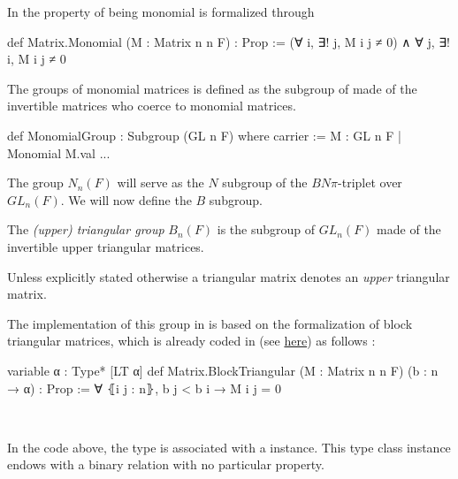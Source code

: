 \begin{implementation}
    In \Lean the property of being monomial is formalized through
    \begin{leancode}
def Matrix.Monomial (M : Matrix n n F) : Prop := 
    (∀ i, ∃! j, M i j ≠ 0) ∧ ∀ j, ∃! i, M i j ≠ 0
    \end{leancode}
    The groups of monomial matrices is defined as the subgroup of  made of the invertible matrices who coerce to monomial matrices.
    \begin{leancode}
def MonomialGroup : Subgroup (GL n F) where
  carrier := {M : GL n F | Monomial M.val}
    ...
\end{leancode}

\begin{comment}
    In the above code, the term \lean{M.val : Matrix n n F} designates the underlying matrix of the invertible matrix \lean{M : GL n F}.
\end{comment}
\end{implementation}

The group $N_n\left( F \right)$ will serve as the $N$ subgroup of the $BN\pi$-triplet over $GL_n(F)$. We will now define the $B$ subgroup.

\begin{definition}
    The \emph{(upper) triangular group} $B_n\left( F \right)$ is the subgroup of $GL_n\left( F \right)$ made of the invertible upper triangular matrices.
\end{definition}

\begin{remarque}
Unless explicitly stated otherwise a triangular matrix denotes an \emph{upper} triangular matrix.
\end{remarque}

The implementation of this group in \Lean is based on the formalization of block triangular matrices, which is already coded in \Mathlib (see \href{https://leanprover-community.github.io/mathlib4_docs/Mathlib/LinearAlgebra/Matrix/Block.html#Matrix.BlockTriangular}{here}) as follows :
\begin{leancode}
variable {α : Type*} [LT α]
def Matrix.BlockTriangular (M : Matrix n n F) (b : n → α) : Prop :=
 ∀ ⦃i j : n⦄, b j < b i → M i j = 0
\end{leancode}

\begin{commentary}\

In the code above, the type  is associated with a \lean{[LT α]} instance. This type class instance endows  with a binary relation  with no particular property.
\end{commentary}

